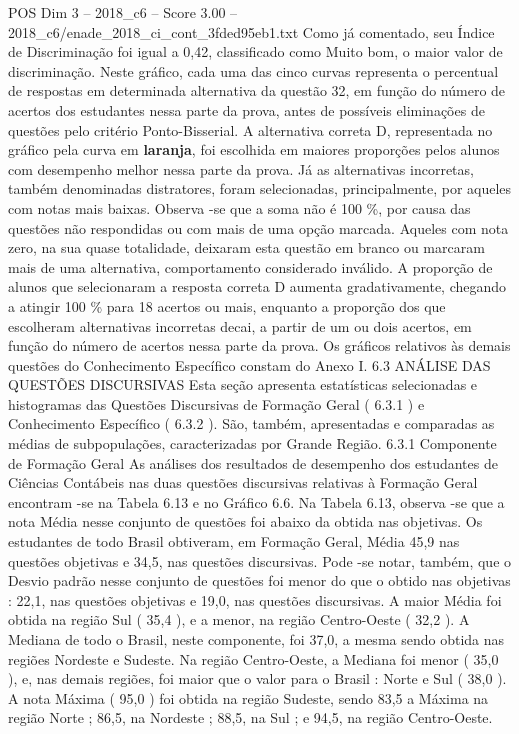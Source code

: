 \begin{textsample}{POS Dim 3 – 2018\_c6 – Score 3.00 – 2018\_c6/enade\_2018\_ci\_cont\_3fded95eb1.txt}
Como já comentado, seu Índice de Discriminação foi igual a 0,42, classificado como Muito bom, o maior valor de discriminação.
Neste gráfico, cada uma das cinco curvas representa o percentual de respostas em determinada alternativa da questão 32, em função do número de acertos dos estudantes nessa parte da prova, antes de possíveis eliminações de questões pelo critério Ponto-Bisserial.
A alternativa correta D, representada no gráfico pela curva em \textbf{laranja}, foi escolhida em maiores proporções pelos alunos com desempenho melhor nessa parte da prova.
Já as alternativas incorretas, também denominadas distratores, foram selecionadas, principalmente, por aqueles com notas mais baixas.
Observa -se que a soma não é 100 \%, por causa das questões não respondidas ou com mais de uma opção marcada.
Aqueles com nota zero, na sua quase totalidade, deixaram esta questão em branco ou marcaram mais de uma alternativa, comportamento considerado inválido.
A proporção de alunos que selecionaram a resposta correta D aumenta gradativamente, chegando a atingir 100 \% para 18 acertos ou mais, enquanto a proporção dos que escolheram alternativas incorretas decai, a partir de um ou dois acertos, em função do número de acertos nessa parte da prova.
Os gráficos relativos às demais questões do Conhecimento Específico constam do Anexo I. 6.3 ANÁLISE DAS QUESTÕES DISCURSIVAS Esta seção apresenta estatísticas selecionadas e histogramas das Questões Discursivas de Formação Geral ( 6.3.1 ) e Conhecimento Específico ( 6.3.2 ).
São, também, apresentadas e comparadas as médias de subpopulações, caracterizadas por Grande Região. 6.3.1 Componente de Formação Geral As análises dos resultados de desempenho dos estudantes de Ciências Contábeis nas duas questões discursivas relativas à Formação Geral encontram -se na Tabela 6.13 e no Gráfico 6.6.
Na Tabela 6.13, observa -se que a nota Média nesse conjunto de questões foi abaixo da obtida nas objetivas.
Os estudantes de todo Brasil obtiveram, em Formação Geral, Média 45,9 nas questões objetivas e 34,5, nas questões discursivas.
Pode -se notar, também, que o Desvio padrão nesse conjunto de questões foi menor do que o obtido nas objetivas : 22,1, nas questões objetivas e 19,0, nas questões discursivas.
A maior Média foi obtida na região Sul ( 35,4 ), e a menor, na região Centro-Oeste ( 32,2 ).
A Mediana de todo o Brasil, neste componente, foi 37,0, a mesma sendo obtida nas regiões Nordeste e Sudeste.
Na região Centro-Oeste, a Mediana foi menor ( 35,0 ), e, nas demais regiões, foi maior que o valor para o Brasil : Norte e Sul ( 38,0 ).
A nota Máxima ( 95,0 ) foi obtida na região Sudeste, sendo 83,5 a Máxima na região Norte ; 86,5, na Nordeste ; 88,5, na Sul ; e 94,5, na região Centro-Oeste.

\end{textsample}
